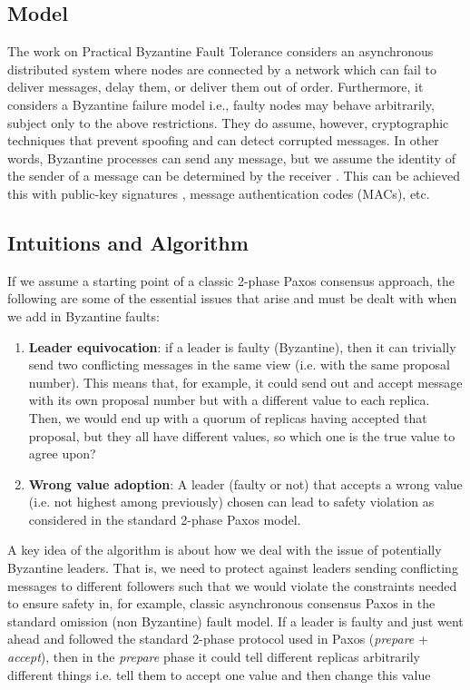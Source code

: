 \documentclass[10pt,a4paper]{article}
\begin{document}
\subsection{Model}

The work on Practical Byzantine Fault Tolerance \cite{1999castropbft} considers an asynchronous distributed system where nodes are connected by a network which can fail to deliver messages, delay them, or deliver them out of order. Furthermore, it considers a Byzantine failure model i.e., faulty nodes may behave arbitrarily, subject only to the above restrictions. They do assume, however, cryptographic techniques that prevent spoofing and can detect corrupted messages. In other words, Byzantine processes can send any message, but we assume the identity of the sender of a message can be determined by the receiver \cite{2011lamport}. This can be achieved this with public-key signatures \cite{1978rivestcrypto}, message authentication codes (MACs), etc.

\subsection{Intuitions and Algorithm}

If we assume a starting point of a classic 2-phase Paxos consensus approach, the following are some of the essential issues that arise and must be dealt with when we add in Byzantine faults:
\begin{enumerate}
    \item \textbf{Leader equivocation}: if a leader is faulty (Byzantine), then it can trivially send two conflicting messages in the same view (i.e. with the same proposal number). This means that, for example, it could send out and accept message with its own proposal number but with a different value to each replica. Then, we would end up with a quorum of replicas having accepted that proposal, but they all have different values, so which one is the true value to agree upon?
    \item \textbf{Wrong value adoption}: A leader (faulty or not) that accepts a wrong value  (i.e. not highest among previously) chosen can lead to safety violation as considered in the standard 2-phase Paxos model.
\end{enumerate}
A key idea of the algorithm is about how we deal with the issue of potentially Byzantine leaders. That is, we need to protect against leaders sending conflicting messages to different followers such that we would violate the constraints needed to ensure safety in, for example, classic asynchronous consensus Paxos in the standard omission (non Byzantine) fault model. If a leader is faulty and just went ahead and followed the standard 2-phase protocol used in Paxos (\textit{prepare} + \textit{accept}), then in the \textit{prepare} phase it could tell different replicas arbitrarily different things i.e. tell them to accept one value and then change this value 
\end{document}

